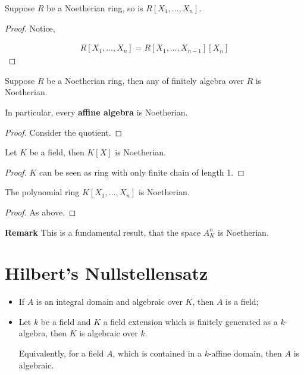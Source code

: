 \documentclass[Total.tex]{subfiles}
\begin{document}
	\begin{corollary}
		Suppose $R$ be a Noetherian ring, so is $R[X_1,\dots,X_n]$.
	\end{corollary}
	
	\begin{proof}
		Notice,
		
		\begin{gather*}
			R[X_1,\dots,X_n]=R[X_1,\dots,X_{n-1}][X_n]
		\end{gather*}
	\end{proof}
	
	\begin{corollary}
		Suppose $R$ be a Noetherian ring, then any of finitely algebra over $R$ is Noetherian. 
		
		In particular, every \textbf{affine algebra} is Noetherian.
	\end{corollary}
	
	\begin{proof}
		Consider the quotient.
	\end{proof}
	
	\begin{lemma}
		Let $K$ be a field, then $K[X]$ is Noetherian.
	\end{lemma}
	
	\begin{proof}
		$K$ can be seen as ring with only finite chain of length 1.
	\end{proof}
	
	\begin{corollary}
		The polynomial ring $K[X_1,\dots,X_n]$ is Noetherian.
	\end{corollary}
	
	\begin{proof}
		As above.
	\end{proof}	
	
	\textbf{Remark} This is a fundamental result, that the space $A^n_K$ is Noetherian.
	
	\section{Hilbert's Nullstellensatz}
	
	
	\begin{lemma}
		\begin{itemize}
			\item If $A$ is an integral domain and algebraic over $K$, then $A$ is a field;
			\item Let $k$ be a field and $K$ a field extension which is finitely generated as a $k$-algebra, then $K$ is algebraic over $k$.
			
			Equivalently, for a field $A$, which is contained in a $k$-affine domain, then $A$ is algebraic.	
		\end{itemize}
	\end{lemma}
	
\end{document}
